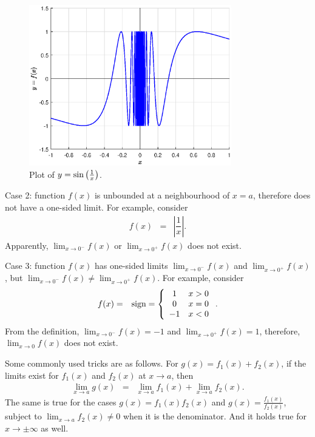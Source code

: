 \begin{figure}
\centering
\includegraphics[width=250pt]{chapters/chapter1/figures/fig_sinoneoverx.eps}
\caption{Plot of $y=\textup{sin}\left(\frac{1}{x}\right)$.} \label{ch1fig:sinoneoverx}
\end{figure}

Case 2: function $f(x)$ is unbounded at a neighbourhood of $x=a$, therefore does not have a one-sided limit. For example, consider
\begin{eqnarray}
  f(x) &=& \left|\dfrac{1}{x}\right|. \nonumber
\end{eqnarray}
Apparently, $\lim_{x\rightarrow 0^-}f(x)$ or $\lim_{x\rightarrow 0^+}f(x)$ does not exist.

Case 3: function $f(x)$ has one-sided limits $\lim_{x\rightarrow 0^-}f(x)$ and $\lim_{x\rightarrow 0^+}f(x)$, but $\lim_{x\rightarrow 0^-}f(x) \neq \lim_{x\rightarrow 0^+}f(x)$. For example, consider
\begin{eqnarray}
  f(x) &=& \textup{sign} = \left\{\begin{array}{cc}
                                    1 & x > 0 \\
                                    0 & x = 0 \\
                                    -1 & x < 0
                                  \end{array}\right..\nonumber
\end{eqnarray}
From the definition, $\lim_{x\rightarrow 0^-}f(x)=-1$ and $\lim_{x\rightarrow 0^+}f(x)=1$, therefore, $\lim_{x\rightarrow 0}f(x)$ does not exist.

Some commonly used tricks are as follows. For $g(x)=f_1(x) + f_2(x)$, if the limits exist for $f_1(x)$ and $f_2(x)$ at $x \rightarrow a$, then
\begin{eqnarray}
  \lim_{x \rightarrow a}g(x) &=& \lim_{x \rightarrow a}f_1(x) + \lim_{x \rightarrow a}f_2(x). \nonumber
\end{eqnarray}
The same is true for the cases $g(x)=f_1(x)f_2(x)$ and $g(x)=\frac{f_1(x)}{f_2(x)}$, subject to $\lim_{x \rightarrow a}f_2(x) \neq 0$ when it is the denominator. And it holds true for $x \rightarrow \pm \infty$ as well.

